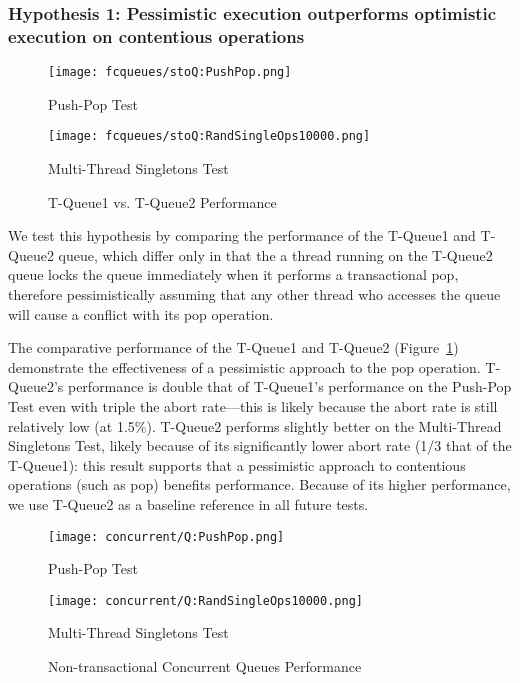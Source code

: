 \subsubsection{Hypothesis 1: Pessimistic execution outperforms optimistic execution on contentious operations}
\begin{figure}[t]
    \centering
	\begin{minipage}{0.45\textwidth}
	    \texttt{[image: fcqueues/stoQ:PushPop.png]}
        \caption*{Push-Pop Test}
	\end{minipage}
	\begin{minipage}{0.45\textwidth}
	    \texttt{[image: fcqueues/stoQ:RandSingleOps10000.png]}
        \caption*{Multi-Thread Singletons Test}
	\end{minipage}
    \caption{T-Queue1 vs. T-Queue2 Performance}
    \label{fig:stoqs}
\end{figure}


We test this hypothesis by comparing the performance of the T-Queue1 and T-Queue2 queue, which differ only in that the a thread running on the T-Queue2 queue locks the queue immediately when it performs a transactional pop, therefore pessimistically assuming that any other thread who accesses the queue will cause a conflict with its pop operation.

The comparative performance of the T-Queue1 and T-Queue2 (Figure~\ref{fig:stoqs}) demonstrate the effectiveness of a pessimistic approach to the pop operation. T-Queue2's performance is double that of T-Queue1's performance on the Push-Pop Test even with triple the abort rate---this is likely because the abort rate is still relatively low (at 1.5\%). T-Queue2 performs slightly better on the Multi-Thread Singletons Test, likely because of its significantly lower abort rate (1/3 that of the T-Queue1): this result supports that a pessimistic approach to contentious operations (such as pop) benefits performance. Because of its higher performance, we use T-Queue2 as a baseline reference in all future tests.

\vspace{12pt}
\noindent{}

\begin{figure}[t]
    \centering
	\begin{minipage}{0.45\textwidth}
	    \texttt{[image: concurrent/Q:PushPop.png]}
        \caption*{Push-Pop Test}
	\end{minipage}
   	\begin{minipage}{0.45\textwidth}
	    \texttt{[image: concurrent/Q:RandSingleOps10000.png]}
        \caption*{Multi-Thread Singletons Test}
	\end{minipage}
        \caption{Non-transactional Concurrent Queues Performance}
    \label{fig:ntqs}
\end{figure}

